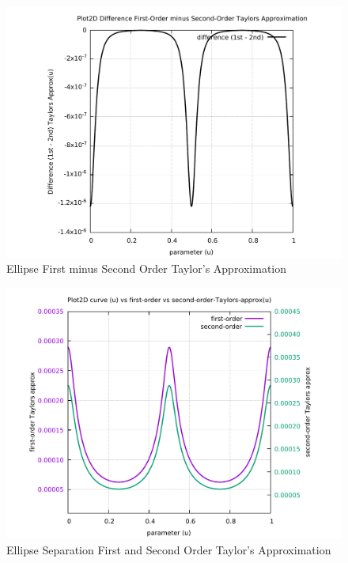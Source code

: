 \begin{figure}
	\caption     {Ellipse First minus Second Order Taylor's Approximation}
	\label{06-img-Ellipse-First-minus-Second-Order-Taylors-Approx.pdf}
	\includegraphics[width=1.00\textwidth]{Chap4/appendix/app-Ellipse/plots/06-img-Ellipse-First-minus-Second-Order-Taylors-Approx.pdf}
\end{figure}

\clearpage
\pagebreak

\begin{figure}
	\caption     {Ellipse Separation First and Second Order Taylor's Approximation}
	\label{07-img-Ellipse-Separation-First-and-Second-Order-Taylors-Approx.pdf}
	\includegraphics[width=1.00\textwidth]{Chap4/appendix/app-Ellipse/plots/07-img-Ellipse-Separation-First-and-Second-Order-Taylors-Approx.pdf}
\end{figure}


